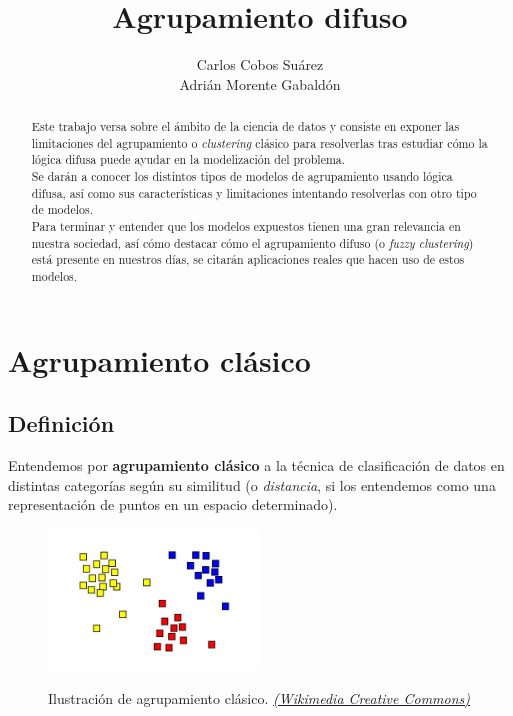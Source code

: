 \documentclass[]{report}
\title{Agrupamiento difuso}
\author{Carlos Cobos Suárez\\Adrián Morente Gabaldón}
\begin{document}
\maketitle

\begin{abstract}
	
	Este trabajo versa sobre el ámbito de la ciencia de datos y consiste en exponer las limitaciones del agrupamiento o \textit{clustering} clásico para resolverlas tras estudiar cómo la lógica difusa puede ayudar en la modelización del problema.\\
	
	Se darán a conocer los distintos tipos de modelos de agrupamiento usando lógica difusa, así como sus características y limitaciones intentando resolverlas con otro tipo de modelos.\\
	
	Para terminar y entender que los modelos expuestos tienen una gran relevancia en nuestra sociedad, así cómo destacar cómo el agrupamiento difuso (o \textit{fuzzy clustering}) está presente en nuestros días, se citarán aplicaciones reales que hacen uso de estos modelos.\\
	
\end{abstract}

	\chapter{Agrupamiento clásico}
	
		\section{Definición}
		
			Entendemos por \textbf{agrupamiento clásico} a la técnica de clasificación de datos en distintas categorías según su similitud (o \textit{distancia}, si los entendemos como una representación de puntos en un espacio determinado).
			
			\begin{figure}[h]
				\centering
				\includegraphics[width=0.5\textwidth]{clustering.png}
				\label{clustering1}
				\caption{Ilustración de agrupamiento clásico. \href{https://en.wikipedia.org/wiki/Cluster_analysis\#/media/File:Cluster-2.svg}{ \textit{(Wikimedia Creative Commons)}}}
			\end{figure}
		
\end{document}

